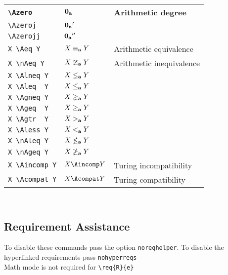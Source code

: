 \documentclass[leqno,11pt]{amsart}
\begin{document}
\begin{xtabular}{l |  l | l}
  \verb=\Azero=                                          & \( 	{\mathbf{0}_{\mathbf{a}}}                                	   \)   & Arithmetic degree \\ \midrule
  \verb=\Azeroj=                                          & \( 	\Azeroj                                	   \)   & \\ \midrule
	\verb=\Azerojj=                                         & \( 	{\mathbf{0}_{\mathbf{a}}}''                               	   \)   & \\ \midrule
  \verb=X \Aeq Y=                                     	 & \( 	X \mathrel{\equiv_{\mathbf{a}}} Y                           	   \)				& Arithmetic equivalence \\ \midrule
	\verb=X \nAeq Y=                                    	 & \( 	X \mathrel{\ncong_{\mathbf{a}}} Y                          	   \)   		& Arithmetic inequivalence \\ \midrule
  \verb=X \Alneq Y=                               			& \(  X \lneq_{\mathbf{a}} Y   \)   & \\ \midrule
  \verb=X \Aleq  Y=                               			& \(  X \leq_{\mathbf{a}}  Y   \)   & \\ \midrule
  \verb=X \Agneq Y=                               			& \(  X \gneq_{\mathbf{a}} Y   \)   & \\ \midrule
  \verb=X \Ageq  Y=                               			& \(  X \geq_{\mathbf{a}}  Y   \)   & \\ \midrule
  \verb=X \Agtr  Y=                               			& \(  X >_{\mathbf{a}}  Y   \)   & \\ \midrule
  \verb=X \Aless Y=                               			& \(  X <_{\mathbf{a}} Y   \)   & \\ \midrule
  \verb=X \nAleq Y=                               			& \(  X \nleq_{\mathbf{a}} Y   \)   & \\ \midrule
  \verb=X \nAgeq Y=                               			& \(  X \ngeq_{\mathbf{a}} Y   \)   & \\ \midrule
  \verb=X \Aincomp Y=                                   & \(  X \Aincomp Y   \) & Turing incompatibility \\ \midrule 
  \verb=X \Acompat Y=                               		&  \(  X \Acompat Y \)  &  Turing compatibility  \\ \midrule

		\bottomrule
	\end{xtabular}          \\
\makeatletter
\subsection{Requirement Assistance}
To disable these commands pass the option \verb=noreqhelper=. To disable the hyperlinked requirements pass \verb=nohyperreqs=\\
Math mode is not required for \verb=\req{R}{e}=
\end{document}
